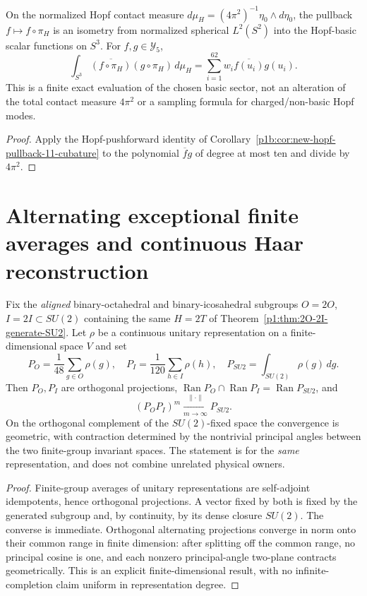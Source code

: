 \documentclass[11pt]{article}
\begin{document}
\begin{corollary}
\label{p1b:cor:cc13-hopf-basic-frame}
On the normalized Hopf contact measure
$d\mu_H=(4\pi^2)^{-1}\eta_0\wedge d\eta_0$, the pullback
$f\mapsto f\circ\pi_H$ is an isometry from normalized spherical
$L^2(S^2)$ into the Hopf-basic scalar functions on $S^3$.  For
$f,g\in\mathscr Y_5$,
\[
 \boxed{\int_{S^3}\overline{(f\circ\pi_H)}(g\circ\pi_H)
 \,d\mu_H=\sum_{i=1}^{62}w_i\overline{f(u_i)}g(u_i).}
\]
This is a finite exact evaluation of the chosen basic sector, not
an alteration of the total contact measure $4\pi^2$ or a sampling
formula for charged/non-basic Hopf modes.
\end{corollary}
\begin{proof}
Apply the Hopf-pushforward identity of
Corollary~\ref{p1b:cor:new-hopf-pullback-11-cubature} to the
polynomial $\overline f g$ of degree at most ten and divide by $4\pi^2$.
\end{proof}

\section{Alternating exceptional finite averages and continuous Haar reconstruction}
\label{p1b:sec:cc15-exceptional-symmetrizer}
\begin{theorem}
\label{p1b:thm:cc15-alternating-haar}
Fix the \emph{aligned} binary-octahedral and binary-icosahedral subgroups
$O=2O$, $I=2I\subset SU(2)$ containing the same $H=2T$ of
Theorem~\ref{p1:thm:2O-2I-generate-SU2}.  Let $\rho$ be a continuous
unitary representation on a finite-dimensional space $V$ and set
\[
 P_O=\frac1{48}\sum_{g\in O}\rho(g),\quad
 P_I=\frac1{120}\sum_{h\in I}\rho(h),\quad
 P_{SU2}=\int_{SU(2)}\rho(g)\,dg.
\]
Then $P_O,P_I$ are orthogonal projections,
$\operatorname{Ran}P_O\cap\operatorname{Ran}P_I
=\operatorname{Ran}P_{SU2}$, and
\[\boxed{(P_OP_I)^m\xrightarrow[m\to\infty]{\|\cdot\|}P_{SU2}.}\]
On the orthogonal complement of the $SU(2)$-fixed space the convergence
is geometric, with contraction determined by the nontrivial principal angles
between the two finite-group invariant spaces. The statement is for the
\emph{same} representation, and does not combine unrelated physical owners.
\end{theorem}
\begin{proof}
Finite-group averages of unitary representations are self-adjoint
idempotents, hence orthogonal projections.  A vector fixed by both
is fixed by the generated subgroup and, by continuity, by its dense closure
$SU(2)$. The converse is immediate. Orthogonal alternating projections
converge in norm onto their common range in finite dimension: after splitting
off the common range, no principal cosine is one, and each nonzero
principal-angle two-plane contracts geometrically.  This is an explicit
finite-dimensional result, with no infinite-completion claim uniform in
representation degree.
\end{proof}
\end{document}
